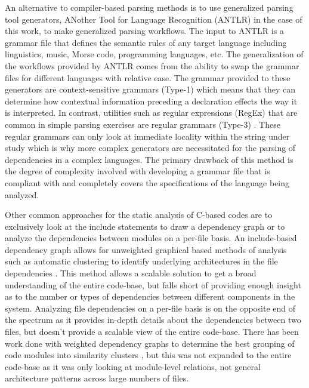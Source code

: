 An alternative to compiler-based parsing methods is to use generalized parsing tool generators, ANother Tool for Language Recognition (ANTLR) \cite{antlr4github, parr2013antlr} in the case of this work, to make generalized parsing workflows. The input to ANTLR is a grammar file that defines the semantic rules of any target language including linguistics, music, Morse code, programming languages, etc. The generalization of the workflows provided by ANTLR comes from the ability to swap the grammar files for different languages with relative ease. The grammar provided to these generators are context-sensitive grammars (Type-1) which means that they can determine how contextual information preceding a declaration effects the way it is interpreted. In contrast, utilities such as regular expressions (RegEx) that are common in simple parsing exercises are regular grammars (Type-3) \cite{hopcroft2006automata}. These regular grammars can only look at immediate locality within the string under study which is why more complex generators are necessitated for the parsing of dependencies in a complex languages. The primary drawback of this method is the degree of complexity involved with developing a grammar file that is compliant with and completely covers the specifications of the language being analyzed.

Other common approaches for the static analysis of C-based codes are to exclusively look at the include statements to draw a dependency graph \cite{cincludegraph} or to analyze the dependencies between modules on a per-file basis. An include-based dependency graph allows for unweighted graphical based methods of analysis such as automatic clustering to identify underlying architectures in the file dependencies \cite{792498_bunch, 693283_auto_clustering}. This method allows a scalable solution to get a broad understanding of the entire code-base, but falls short of providing enough insight as to the number or types of dependencies between different components in the system. Analyzing file dependencies on a per-file basis is on the opposite end of the spectrum as it provides in-depth details about the dependencies between two files, but doesn't provide a scalable view of the entire code-base. There has been work done with weighted dependency graphs to determine the best grouping of code modules into similarity clusters \cite{5286612}, but this was not expanded to the entire code-base as it was only looking at module-level relations, not general architecture patterns across large numbers of files.

